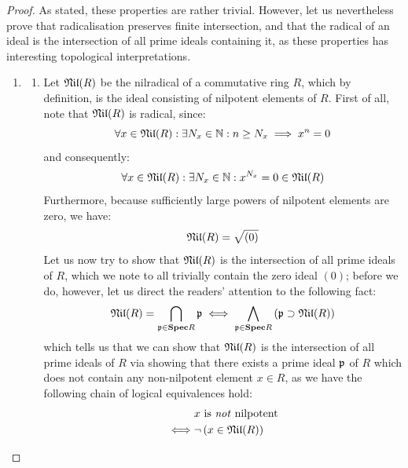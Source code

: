                     \begin{proof}
                        As stated, these properties are rather trivial. However, let us nevertheless prove that radicalisation preserves finite intersection, and that the radical of an ideal is the intersection of all prime ideals containing it, as these properties has interesting topological interpretations.
                            \begin{enumerate}
                                \item 
                                    \begin{enumerate}
                                        \item Let $\Nil(R)$ be the nilradical of a commutative ring $R$, which by definition, is the ideal consisting of nilpotent elements of $R$. First of all, note that $\Nil(R)$ is radical, since:
                                            $$\forall x \in \Nil(R): \exists N_x \in \N: n \geq N_x \implies x^n = 0$$
                                        and consequently:
                                            $$\forall x \in \Nil(R): \exists N_x \in \N: x^{N_x} = 0 \in \Nil(R)$$
                                        Furthermore, because sufficiently large powers of nilpotent elements are zero, we have:
                                            $$\Nil(R) = \sqrt{(0)}$$
                                        Let us now try to show that $\Nil(R)$ is the intersection of all prime ideals of $R$, which we note to all trivially contain the zero ideal $(0)$; before we do, however, let us direct the readers' attention to the following fact:
                                            $$\Nil(R) = \bigcap_{\p \in \Spec R} \p \iff \bigwedge_{\p \in \Spec R} \left(\p \supset \Nil(R)\right)$$
                                        which tells us that we can show that $\Nil(R)$ is the intersection of all prime ideals of $R$ via showing that there exists a prime ideal $\p$ of $R$ which does not contain any non-nilpotent element $x \in R$, as we have the following chain of logical equivalences hold:
                                            $$
                                                \begin{aligned}
                                                    & \text{$x$ is \textit{not} nilpotent}
                                                    \\
                                                    \iff & \neg \left(x \in \Nil(R)\right)
                                                    \\

\end{aligned}$$
\end{enumerate}
\end{enumerate}
\end{proof}
